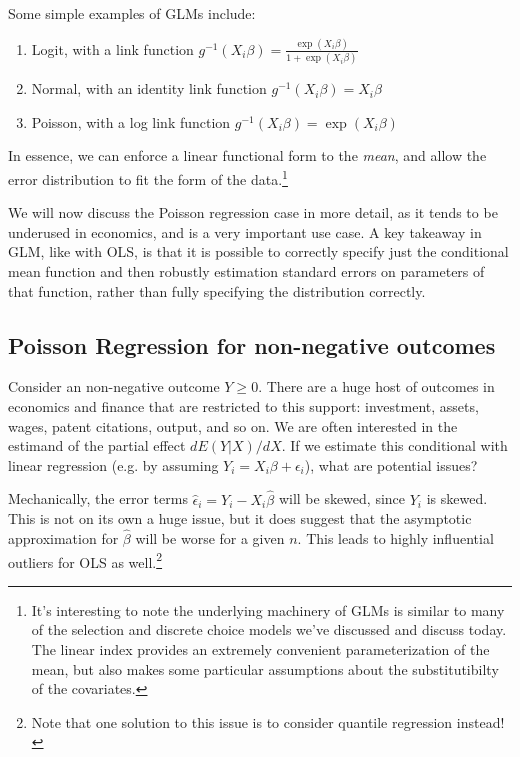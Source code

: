 \documentclass{tufte-handout}
\theoremstyle{break}
\begin{document}
Some simple examples of GLMs include:
        \begin{enumerate}
        \item Logit, with a link function $g^{-1}(X_{i}\beta) = \frac{\exp(X_{i}\beta)}{1+\exp(X_{i}\beta)}$
        \item Normal, with an identity link function $g^{-1}(X_{i}\beta) = X_{i}\beta$
        \item Poisson, with a log link function $g^{-1}(X_{i}\beta) = \exp(X_{i}\beta)$
        \end{enumerate}

In essence, we can enforce a linear functional form to the \emph{mean}, and allow the error distribution to fit the form of the data.\footnote{It's interesting to note the underlying machinery of GLMs is similar to many of the selection and discrete choice models we've discussed and discuss today. The linear index provides an extremely convenient parameterization of the mean, but also makes some particular assumptions about the substitutibilty of the covariates.} 

We will now discuss the Poisson regression case in more detail, as it tends to be underused in economics, and is a very important use case. A key takeaway in GLM, like with OLS, is that it is possible to correctly specify just the conditional mean function and then robustly estimation standard errors on parameters of that function, rather than fully specifying the distribution correctly.

\subsection{Poisson Regression for non-negative outcomes}

Consider an non-negative outcome $Y \geq 0$. There are a huge host of outcomes in economics and finance that are restricted to this support: investment, assets, wages, patent citations, output, and so on. We are often interested in the estimand of the partial effect $dE(Y | X) / dX$. If we estimate this conditional with linear regression (e.g. by assuming $Y_{i} = X_{i}\beta + \epsilon_{i}$), what are potential issues?

Mechanically, the error terms $\hat{\epsilon}_{i} = Y_{i} - X_{i}\hat{\beta}$ will be skewed, since $Y_{i}$ is skewed. This is not on its own a huge issue, but it does suggest that the asymptotic approximation for $\hat{\beta}$ will be worse for a given $n$. This leads to highly influential outliers for OLS as well.\footnote{Note that one solution to this issue is to consider quantile regression instead!} 
\end{document}
